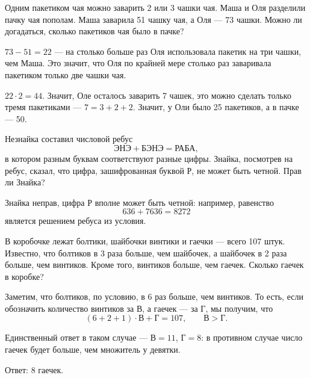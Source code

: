 \begin{itemize}

	\itA Одним пакетиком чая можно заварить 2 или 3 чашки чая. Маша и Оля разделили пачку чая пополам. Маша заварила 51 чашку чая, а Оля — 73 чашки. Можно ли догадаться, сколько пакетиков чая было в пачке?
	
	\itr $73-51 = 22$ — на столько больше раз Оля использовала пакетик на три чашки, чем Маша. Это значит, что Оля по крайней мере столько раз заваривала пакетиком только две чашки чая.
	
	$22 \cdot 2 = 44$. Значит, Оле осталось заварить 7 чашек, это можно сделать только тремя пакетиками — $7=3+2+2$. Значит, у Оли было 25 пакетиков, а в пачке — 50.
	
	\itB Незнайка составил числовой ребус
	$$\text{ЭНЭ}+\text{БЭНЭ}=\text{РАБА},$$
	в котором разным буквам соответствуют разные цифры. Знайка, посмотрев на ребус, сказал, что цифра, зашифрованная буквой Р, не может быть четной. Прав ли Знайка?
	
	\itr Знайка неправ, цифра Р вполне может быть четной: например, равенство
	$$636+7636=8272$$
	является решением ребуса из условия.
	
	\itC В коробочке лежат болтики, шайбочки винтики и гаечки — всего 107 штук. Известно, что болтиков в 3 раза больше, чем шайбочек, а шайбочек в 2 раза больше, чем винтиков. Кроме того, винтиков больше, чем гаечек. Сколько гаечек в коробке?
	
	\itr Заметим, что болтиков, по условию, в 6 раз больше, чем винтиков. То есть, если обозначить количество винтиков за В, а гаечек — за Г, мы получим, что
	$$(6+2+1) \cdot \text{В} + \text{Г} = 107,\qquad \text{В} > \text{Г}.$$
	
	Единственный ответ в таком случае — $\text{В} = 11$, $\text{Г} = 8$: в противном случае число гаечек будет больше, чем множитель у девятки.
	
	Ответ: 8 гаечек.

\end{itemize}